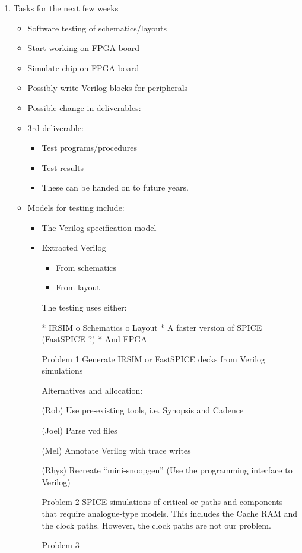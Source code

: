 \documentclass{article}
\begin{document}
\begin{flushleft}
\begin{enumerate}
  \item Tasks for the next few weeks 
    \begin{itemize}
    \item Software testing of schematics/layouts
    \item Start working on FPGA board
    \item Simulate chip on FPGA board
    \item Possibly write Verilog blocks for peripherals
    \item Possible change in deliverables:
    \item 3rd deliverable:
    \begin{itemize}
      \item Test programs/procedures
      \item Test results
      \item These can be handed on to future years.
    \end{itemize}
    \item Models for testing include:
    \begin{itemize}
      \item The Verilog specification model
      \item Extracted Verilog
        \begin{itemize}
          \item From schematics
          \item From layout
        \end{itemize}
    The testing uses either:

    * IRSIM
          o Schematics
          o Layout
    * A faster version of SPICE (FastSPICE ?)
    * And FPGA

 

Problem 1 Generate IRSIM or FastSPICE decks from Verilog simulations 

Alternatives and allocation:

(Rob) Use pre-existing tools, i.e. Synopsis and Cadence

(Joel) Parse vcd files

(Mel) Annotate Verilog with trace writes

(Rhys) Recreate “mini-snoopgen” (Use the programming interface to Verilog) 

Problem 2 SPICE simulations of critical or paths and components that require analogue-type models. This includes the Cache RAM and the clock paths. However, the clock paths are not our problem. 

Problem 3


\end{itemize}
\end{itemize}
\end{enumerate}
\end{flushleft}
\end{document}
